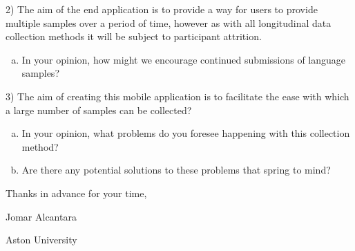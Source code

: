 \documentclass{letter}
\begin{document}
2) The aim of the end application is to provide a way for users to provide multiple samples over a period of time, however as with all longitudinal data collection methods it will be subject to participant attrition.
\begin{enumerate}[(a)]
	\item In your opinion, how might we encourage continued submissions of language samples?
\end{enumerate}

3) The aim of creating this mobile application is to facilitate the ease with which a large number of samples can be collected? 
\begin{enumerate}[(a)]
	\item In your opinion, what problems do you foresee happening with this collection method? 
	\item Are there any potential solutions to these problems that spring to mind?
\end{enumerate}
Thanks in advance for your time,

Jomar Alcantara

Aston University
\end{document}
